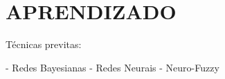 \chapter{APRENDIZADO}
\label{cap:ai}

Técnicas previtas:

- Redes Bayesianas
- Redes Neurais
- Neuro-Fuzzy
